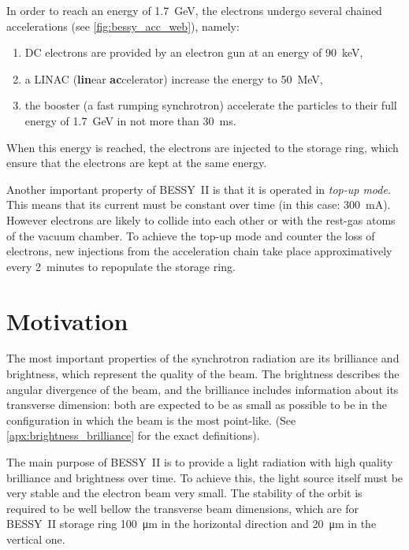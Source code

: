 In order to reach an energy of \SI{1.7}{\giga\electronvolt}, the electrons undergo several chained accelerations (see \cref{fig:bessy_acc_web}), namely:
\begin{enumerate}
    \item DC electrons are provided by an electron gun at an energy of \SI{90}{\kilo\electronvolt},
    \item a LINAC (\textbf{lin}ear \textbf{ac}celerator) increase the energy to \SI{50}{\mega\electronvolt},
    \item the booster (a fast rumping synchrotron) accelerate the particles to their full energy of \SI{1.7}{\giga\electronvolt} in not more than \SI{30}{\milli\second}.
\end{enumerate}

When this energy is reached, the electrons are injected to the storage ring, which ensure that the electrons are kept at the same energy.

Another important property of BESSY~II is that it is operated in \textit{top-up mode}. This means that its current must be constant over time (in this case: \SI{300}{\milli\ampere}). However electrons are likely to collide into each other or with the rest-gas atoms of the vacuum chamber. To achieve the top-up mode and counter the loss of electrons, new injections from the acceleration chain take place approximatively every 2~minutes to repopulate the storage ring.

\section{Motivation}
The most important properties of the synchrotron radiation are its brilliance and brightness, which represent the quality of the beam. The brightness describes the angular divergence of the beam, and the brilliance includes information about its transverse dimension: both are expected to be as small as possible to be in the configuration in which the beam is the most point-like. (See \cref{apx:brightness_brilliance} for the exact definitions).

The main purpose of BESSY~II is to provide a light radiation with high quality brilliance and brightness over time. To achieve this, the light source itself must be very stable and the electron beam very small. The stability of the orbit is required to be well bellow the transverse beam dimensions, which are for BESSY~II storage ring \SI{100}{\micro\meter} in the horizontal direction and \SI{20}{\micro\meter} in the vertical one.

